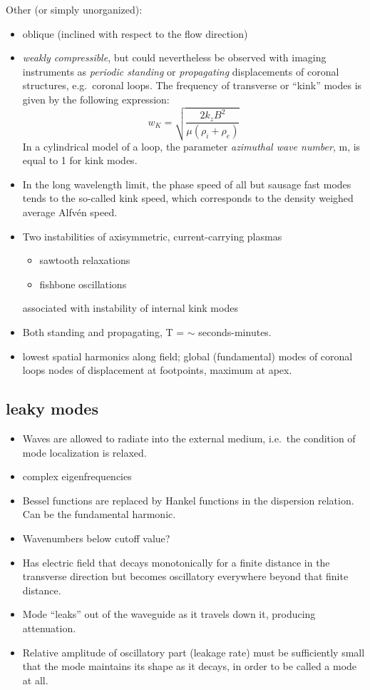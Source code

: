 \documentclass{article}
\begin{document}
Other (or simply unorganized):
\begin{itemize}
    \item oblique (inclined with respect to the flow direction)
    \item \emph{weakly compressible}, but could nevertheless be
        observed with imaging instruments as \emph{periodic standing}
        or \emph{propagating} displacements of coronal structures, e.g.\ coronal loops.
        The frequency of transverse or ``kink'' modes is given by the following expression:
            $$ w_K = \sqrt{ \frac{2k_zB^2}{\mu(\rho_i+\rho_e)}  }   $$
        In a cylindrical model of a loop,
        the parameter \emph{azimuthal wave number},
        m, is equal to 1 for kink modes.
    \item In the long wavelength limit, the phase speed of all but
        sausage fast modes tends to the so-called kink speed,
        which corresponds to the density weighed average Alfv\'en speed.
    \item Two instabilities of axisymmetric, current-carrying plasmas
        \begin{itemize}
            \item sawtooth relaxations
            \item fishbone oscillations
        \end{itemize}
        associated with instability of internal kink modes
    \item Both standing and propagating, T = $\sim$ seconds-minutes.
    \item lowest spatial harmonics along field; global (fundamental)
        modes of coronal loops nodes of displacement at footpoints,
        maximum at apex.
\end{itemize}

\subsection{leaky modes}
\begin{itemize}
    \item Waves are allowed to radiate into the external medium,
        i.e.\ the condition of mode localization is relaxed.
    \item complex eigenfrequencies
    \item Bessel functions are replaced by Hankel functions in the
        dispersion relation. Can be the fundamental harmonic.
    \item Wavenumbers below cutoff value?
    \item Has electric field that decays monotonically for a finite
        distance in the transverse direction but becomes oscillatory
        everywhere beyond that finite distance.
    \item Mode ``leaks'' out of
        the waveguide as it travels down it, producing attenuation.
    \item Relative amplitude of oscillatory part (leakage rate)
        must be sufficiently small that the mode maintains its
        shape as it decays, in order to be called a mode at all.
\end{itemize}
\end{document}
